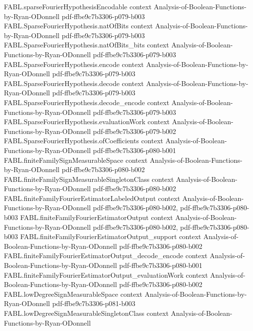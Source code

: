 \begin{theorem}
\proofstep
  {FABL.sparseFourierHypothesisEncodable}
  {context}
  {Analysis-of-Boolean-Functions-by-Ryan-ODonnell}
  {pdf-ffbe9c7b3306-p079-b003}
\proofstep
  {FABL.SparseFourierHypothesis.natOfBits}
  {context}
  {Analysis-of-Boolean-Functions-by-Ryan-ODonnell}
  {pdf-ffbe9c7b3306-p079-b003}
\proofstep
  {FABL.SparseFourierHypothesis.natOfBits_bits}
  {context}
  {Analysis-of-Boolean-Functions-by-Ryan-ODonnell}
  {pdf-ffbe9c7b3306-p079-b003}
\proofstep
  {FABL.SparseFourierHypothesis.encode}
  {context}
  {Analysis-of-Boolean-Functions-by-Ryan-ODonnell}
  {pdf-ffbe9c7b3306-p079-b003}
\proofstep
  {FABL.SparseFourierHypothesis.decode}
  {context}
  {Analysis-of-Boolean-Functions-by-Ryan-ODonnell}
  {pdf-ffbe9c7b3306-p079-b003}
\proofstep
  {FABL.SparseFourierHypothesis.decode_encode}
  {context}
  {Analysis-of-Boolean-Functions-by-Ryan-ODonnell}
  {pdf-ffbe9c7b3306-p079-b003}
\proofstep
  {FABL.SparseFourierHypothesis.evaluationWork}
  {context}
  {Analysis-of-Boolean-Functions-by-Ryan-ODonnell}
  {pdf-ffbe9c7b3306-p079-b002}
\proofstep
  {FABL.SparseFourierHypothesis.ofCoefficients}
  {context}
  {Analysis-of-Boolean-Functions-by-Ryan-ODonnell}
  {pdf-ffbe9c7b3306-p080-b001}
\proofstep
  {FABL.finiteFamilySignMeasurableSpace}
  {context}
  {Analysis-of-Boolean-Functions-by-Ryan-ODonnell}
  {pdf-ffbe9c7b3306-p080-b002}
\proofstep
  {FABL.finiteFamilySignMeasurableSingletonClass}
  {context}
  {Analysis-of-Boolean-Functions-by-Ryan-ODonnell}
  {pdf-ffbe9c7b3306-p080-b002}
\proofstep
  {FABL.finiteFamilyFourierEstimatorLabeledOutput}
  {context}
  {Analysis-of-Boolean-Functions-by-Ryan-ODonnell}
  {pdf-ffbe9c7b3306-p080-b002,
    pdf-ffbe9c7b3306-p080-b003}
\proofstep
  {FABL.finiteFamilyFourierEstimatorOutput}
  {context}
  {Analysis-of-Boolean-Functions-by-Ryan-ODonnell}
  {pdf-ffbe9c7b3306-p080-b002,
    pdf-ffbe9c7b3306-p080-b003}
\proofstep
  {FABL.finiteFamilyFourierEstimatorOutput_support}
  {context}
  {Analysis-of-Boolean-Functions-by-Ryan-ODonnell}
  {pdf-ffbe9c7b3306-p080-b002}
\proofstep
  {FABL.finiteFamilyFourierEstimatorOutput_decode_encode}
  {context}
  {Analysis-of-Boolean-Functions-by-Ryan-ODonnell}
  {pdf-ffbe9c7b3306-p080-b001}
\proofstep
  {FABL.finiteFamilyFourierEstimatorOutput_evaluationWork}
  {context}
  {Analysis-of-Boolean-Functions-by-Ryan-ODonnell}
  {pdf-ffbe9c7b3306-p080-b002}
\proofstep
  {FABL.lowDegreeSignMeasurableSpace}
  {context}
  {Analysis-of-Boolean-Functions-by-Ryan-ODonnell}
  {pdf-ffbe9c7b3306-p081-b003}
\proofstep
  {FABL.lowDegreeSignMeasurableSingletonClass}
  {context}
  {Analysis-of-Boolean-Functions-by-Ryan-ODonnell}

\end{theorem}

